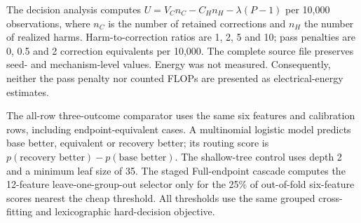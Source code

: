 \documentclass[10pt]{article}
\begin{document}
\begin{table}[ht]
\centering
\caption{Lite-CF regularization path. Values average five grouped repeats for each of 10 endpoint pairs. The original router setting $C=0.05$ was selected before the post hoc support gate was proposed; it is a strong-shrinkage choice rather than the calibration-discrimination optimum.}
\resizebox{0.72\textwidth}{!}{}
\end{table}

\begin{table}[ht]
\centering
\caption{Calibration-set-size sensitivity. Values pool seed--repeat summaries and therefore do not share the equal-weight mechanism--seed estimand of the main headline result.}
\resizebox{0.70\textwidth}{!}{}
\end{table}

\begin{table}[ht]
\centering
\caption{Batch-fixed Lite-CF minus PDRF macro-AUROC. Each cell holds a paired mean and 95\% Student-$t$ interval over 10 fitted model pairs while mechanism, batch and observations remain fixed.}
\resizebox{\textwidth}{!}{}
\end{table}

The decision analysis computes $U=V_C n_C-C_H n_H-\lambda(P-1)$ per 10,000 observations, where $n_C$ is the number of retained corrections and $n_H$ the number of realized harms. Harm-to-correction ratios are 1, 2, 5 and 10; pass penalties are 0, 0.5 and 2 correction equivalents per 10,000. The complete source file preserves seed- and mechanism-level values. Energy was not measured. Consequently, neither the pass penalty nor counted FLOPs are presented as electrical-energy estimates.

\begin{table}[ht]
\centering
\caption{Learned routing and compute controls moved from the main article. Full-endpoint rows route between PDRF and RO-PDRF-Full; Lite-CF routes between PDRF and RO-PDRF-Lite. Prevention and retention are hard-decision outcomes, whereas AUROC and NLL evaluate the emitted probability vector.}
\resizebox{\textwidth}{!}{}
\end{table}

The all-row three-outcome comparator uses the same six features and calibration rows, including endpoint-equivalent cases. A multinomial logistic model predicts base better, equivalent or recovery better; its routing score is $p(\text{recovery better})-p(\text{base better})$. The shallow-tree control uses depth 2 and a minimum leaf size of 35. The staged Full-endpoint cascade computes the 12-feature leave-one-group-out selector only for the 25\% of out-of-fold six-feature scores nearest the cheap threshold. All thresholds use the same grouped cross-fitting and lexicographic hard-decision objective.
\end{document}
